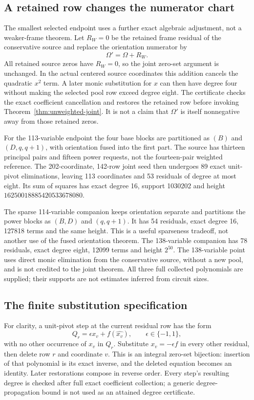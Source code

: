 \subsection{A retained row changes the numerator chart}
The smallest selected endpoint uses a further exact algebraic adjustment,
not a weaker-frame theorem. Let $R_W=0$ be the retained frame residual of
the conservative source and replace the orientation numerator by
\[
 \Omega'=\Omega+R_W.
\]
All retained source zeros have $R_W=0$, so the joint zero-set argument is
unchanged. In the actual centered source coordinates this addition cancels
the quadratic $x^2$ term. A later monic substitution for $x$ can then have
degree four without making the selected pool row exceed degree eight.
The certificate checks the exact coefficient cancellation and restores the
retained row before invoking Theorem~\ref{thm:unweighted-joint}.
It is not a claim that $\Omega'$ is itself nonnegative away from those
retained zeros.

For the 113-variable endpoint the four base blocks are partitioned as
$(B)$ and $(D,q,q+1)$, with orientation fused into the first part. The
source has thirteen principal pairs and fifteen power requests, not the
fourteen-pair weighted reference. The 202-coordinate, 142-row joint seed
then undergoes 89 exact unit-pivot eliminations, leaving 113 coordinates
and 53 residuals of degree at most eight. Its sum of squares has exact
degree 16, support 1030202 and height $16250018885420533678080$.

The sparse 114-variable companion keeps orientation separate and partitions
the power blocks as $(B,D)$ and $(q,q+1)$. It has 54 residuals, exact degree
16, 127818 terms and the same height. This is a useful sparseness tradeoff,
not another use of the fused orientation theorem. The 138-variable companion
has 78 residuals, exact degree eight, 12099 terms and height $2^{50}$.
The 138-variable point uses direct monic elimination from the conservative
source, without a new pool, and is not credited to the joint theorem.
All three full collected polynomials are supplied; their supports are not
estimates inferred from circuit sizes.

\subsection{The finite substitution specification}
For clarity, a unit-pivot step at the current residual row has the form
\[
 Q_r=\epsilon x_v+f(\widehat{x_v}),\qquad\epsilon\in\{-1,1\},
\]
with no other occurrence of $x_v$ in $Q_r$. Substitute $x_v=-\epsilon f$
in every other residual, then delete row $r$ and coordinate $v$. This is
an integral zero-set bijection: insertion of that polynomial is its exact
inverse, and the deleted equation becomes an identity. Later restorations
compose in reverse order. Every step's resulting degree is checked after
full exact coefficient collection; a generic degree-propagation bound is
not used as an attained degree certificate.

